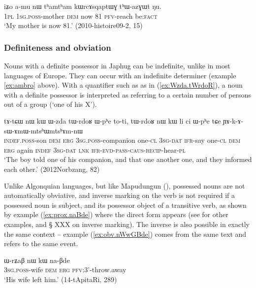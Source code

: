 \begin{exe}
\ex \label{ex:iZo.amu}
\gll iʑo a-mu nɯ tʰamtʰam kɯrcɤsqaptɯɣ tʰɯ-azɣɯt ŋu. \\
\textsc{1pl} \textsc{1sg.poss}-mother \textsc{dem} now 81 \textsc{pfv}-reach  be:\textsc{fact} \\
\glt `My mother is now 81.' (2010-histoire09-2, 15)
\end{exe}

\subsubsection{Definiteness and obviation}
Nouns with a definite possessor in Japhug can be indefinite, unlike in most languages of Europe. They can occur with an indefinite determiner (example \ref{ex:ambro}  above). With a quantifier such as  as in (\ref{ex:Wzda.tWrdoR}), a noun with a definite possessor is interpreted as referring to a certain number of persons out of a group (`one of his X').

 \begin{exe}
\ex \label{ex:Wzda.tWrdoR}
\gll tɤ-tɕɯ nɯ kɯ ɯ-zda tɯ-rdoʁ ɯ-pʰe to-ti, tɯ-rdoʁ nɯ kɯ li ci ɯ-pʰe tɕe ɲɤ-k-ɤ-sɯ-ɤmɯ-mtsʰɯ\redp{}mtsʰɤm-nɯ \\
\textsc{indef.poss}-son \textsc{dem} \textsc{erg} \textsc{3sg.poss}-companion one-\textsc{cl} \textsc{3sg-dat} \textsc{ifr}-say one-\textsc{cl}  \textsc{dem} \textsc{erg} again \textsc{indef} \textsc{3sg-dat} \textsc{lnk}   \textsc{ifr}-\textsc{evd}-\textsc{pass}-\textsc{caus}-\textsc{recip}-hear-\textsc{pl} \\
\glt `The boy told one of his companion, and that one another one, and they informed each other.' (2012Norbzang, 82)
\end{exe}

Unlike Algonquian languages, but like Mapudungun (\citealt{haude16symmetrical}), possessed nouns are not automatically obviative, and inverse marking on the verb is not required if a possessed noun is subject, and its possessor object of a transitive verb, as shown by example (\ref{ex:prox.naBde}) where the direct form  appears (see \citealt{jacques10inverse} for other examples, and § XXX on inverse marking). The inverse  is also possible in exactly the same context -- example  (\ref{ex:obv.nWwGBde}) comes from the same text and refers to the same event.

\begin{exe}
\ex \label{ex:prox.naBde}
\gll ɯ-rʑaβ nɯ kɯ na-βde \\
\textsc{3sg.poss}-wife \textsc{dem} \textsc{erg} \textsc{pfv}:3'-throw.away \\
\glt `His wife left him.' (14-tApitaRi, 289)
\end{exe}

